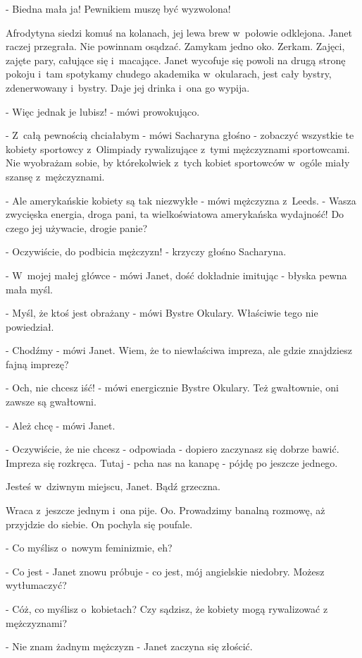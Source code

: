 \documentclass[oneside,polish,12pt,sfheadings]{mwbk}
\begin{document}
- Biedna mała ja! Pewnikiem
muszę być wyzwolona!

Afrodytyna siedzi komuś na kolanach, jej lewa brew w~połowie odklejona.
Janet raczej przegrała. Nie powinnam osądzać. Zamykam jedno oko. Zerkam.
Zajęci, zajęte pary, całujące się i~macające. Janet wycofuje się powoli
na drugą stronę pokoju i~tam spotykamy chudego akademika w~okularach,
jest cały bystry, zdenerwowany i~bystry. Daje jej drinka i~ona go
wypija.

- Więc jednak je lubisz! - mówi prowokująco.

- Z~całą pewnością chciałabym - mówi Sacharyna głośno - zobaczyć wszystkie
te kobiety sportowcy z~Olimpiady rywalizujące z~tymi mężczyznami sportowcami.
Nie wyobrażam sobie, by którekolwiek z~tych kobiet sportowców w~ogóle
miały szansę z~mężczyznami.

- Ale amerykańskie kobiety są tak niezwykłe - mówi mężczyzna z~Leeds.
- Wasza zwycięska energia, droga pani, ta wielkoświatowa amerykańska
wydajność! Do czego jej używacie, drogie panie?

- Oczywiście, do podbicia mężczyzn! - krzyczy głośno Sacharyna.

- W~mojej małej główce - mówi Janet, dość dokładnie imitując - błyska
pewna mała myśl.

- Myśl, że ktoś jest obrażany - mówi Bystre Okulary. Właściwie tego
nie powiedział.

- Chodźmy - mówi Janet. Wiem, że to niewłaściwa impreza, ale gdzie
znajdziesz fajną imprezę?

- Och, nie chcesz iść! - mówi energicznie Bystre Okulary. Też gwałtownie,
oni zawsze są gwałtowni.

- Ależ chcę - mówi Janet.

- Oczywiście, że nie chcesz - odpowiada - dopiero zaczynasz się dobrze
bawić. Impreza się rozkręca. Tutaj - pcha nas na kanapę - pójdę po
jeszcze jednego.

Jesteś w~dziwnym miejscu, Janet. Bądź grzeczna.

Wraca z~jeszcze jednym i~ona pije. Oo. Prowadzimy banalną rozmowę,
aż przyjdzie do siebie. On pochyla się poufale. 

- Co myślisz o~nowym feminizmie, eh?

- Co jest - Janet znowu próbuje - co jest, mój angielskie niedobry.
Możesz wytłumaczyć?

- Cóż, co myślisz o~kobietach? Czy sądzisz, że kobiety mogą rywalizować
z mężczyznami?

- Nie znam żadnym mężczyzn - Janet zaczyna się złościć.
\end{document}
